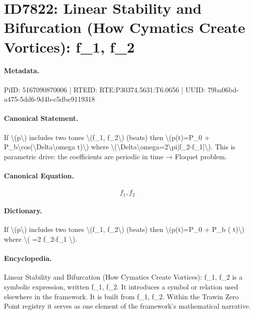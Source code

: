 \section*{ID7822: Linear Stability and Bifurcation (How Cymatics Create Vortices): f\_1, f\_2}
\paragraph{Metadata.}
PiID: 5167090870006 | RTEID: RTE:P30374.5631:T6.0656 | UUID: 79ba06bd-a475-5dd6-9d4b-c5dbe9119318

\paragraph{Canonical Statement.}
If \textbackslash{}(p\textbackslash{}) includes two tones \textbackslash{}(f\_1, f\_2\textbackslash{}) (beats) then \textbackslash{}(p(t)=P\_0 + P\_b\textbackslash{}cos(\textbackslash{}Delta\textbackslash{}omega t)\textbackslash{}) where \textbackslash{}(\textbackslash{}Delta\textbackslash{}omega=2\textbackslash{}pi|f\_2-f\_1|\textbackslash{}). This is parametric drive: the coefficients are periodic in time → Floquet problem.

\paragraph{Canonical Equation.}
\[
f_1, f_2
\]

\paragraph{Dictionary.}
If \textbackslash{}(p\textbackslash{}) includes two tones \textbackslash{}(f\_1, f\_2\textbackslash{}) (beats) then \textbackslash{}(p(t)=P\_0 + P\_b ( t)\textbackslash{}) where \textbackslash{}( =2 f\_2-f\_1 \textbackslash{}).

\paragraph{Encyclopedia.}
Linear Stability and Bifurcation (How Cymatics Create Vortices): f\_1, f\_2 is a symbolic expression, written f\_1, f\_2. It introduces a symbol or relation used elsewhere in the framework. It is built from f\_1, f\_2. Within the Trawin Zero Point registry it serves as one element of the framework's mathematical narrative.
